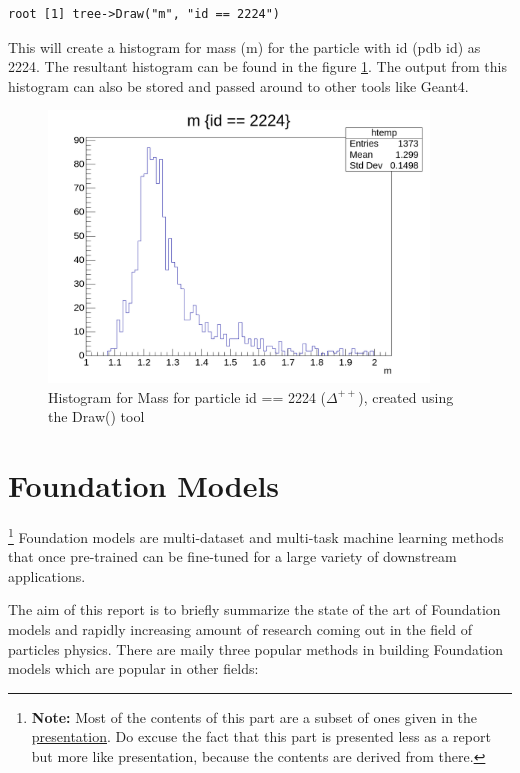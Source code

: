 \documentclass[letterpaper,12pt]{article}
\begin{document}
\begin{spacing}{1.125}
\begin{lstlisting}[style=python]
root [1] tree->Draw("m", "id == 2224")
\end{lstlisting}

This will create a histogram for mass (m) for the particle with id (pdb id) as
2224. The resultant histogram can be found in the figure \ref{m-hist}.
The
output from this histogram can also be stored and passed around to other tools
like Geant4.


\begin{figure}[!htb]
  \includegraphics[width=0.9\textwidth]{m-hist.png}
  \caption{Histogram for Mass for particle id == 2224 ($\Delta^{++}$), created
  using the Draw() tool}
  \label{m-hist}
\end{figure}


\pagebreak
\section{Foundation Models}

\footnote{\textbf{Note:} Most of the contents of this part are a subset of ones given in the
\href{https://github.com/abhiramtilakiiit/research/blob/main/presentations/fm.pdf}{presentation}.
Do excuse the fact that this part is presented less as a report but more like presentation, because the
contents are derived from there.
}
Foundation models are multi-dataset and multi-task machine
learning methods that once pre-trained can be fine-tuned for a
large variety of downstream applications.

The aim of this report is to briefly summarize the state of the art of
Foundation models and rapidly increasing amount of research coming out in
the field of particles physics.
There are maily three popular methods in building Foundation models which are popular
in other fields:


\end{spacing}
\end{document}
